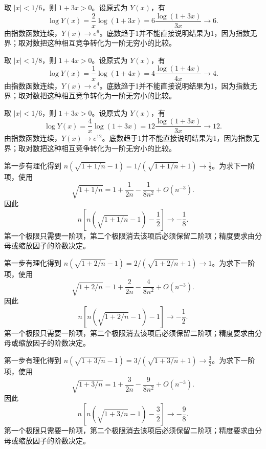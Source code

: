 \documentclass[12pt,fontset=fandol]{ctexart}
\begin{document}
\begin{solve}\label{ans:c5q4}
取 $|x|<1/6$，则 $1+3x>0$。设原式为 $Y(x)$，有
\[
\log Y(x)=\frac{2}x\log(1+3x)=6\frac{\log(1+3x)}{3x}\longrightarrow 6.
\]
由指数函数连续，$Y(x)\to e^{6}$。底数趋于1并不能直接说明结果为1，因为指数无界；取对数把这种相互竞争转化为一阶无穷小的比较。
\end{solve}

\begin{solve}\label{ans:c5q5}
取 $|x|<1/8$，则 $1+4x>0$。设原式为 $Y(x)$，有
\[
\log Y(x)=\frac{1}x\log(1+4x)=4\frac{\log(1+4x)}{4x}\longrightarrow 4.
\]
由指数函数连续，$Y(x)\to e^{4}$。底数趋于1并不能直接说明结果为1，因为指数无界；取对数把这种相互竞争转化为一阶无穷小的比较。
\end{solve}

\begin{solve}\label{ans:c5q6}
取 $|x|<1/6$，则 $1+3x>0$。设原式为 $Y(x)$，有
\[
\log Y(x)=\frac{4}x\log(1+3x)=12\frac{\log(1+3x)}{3x}\longrightarrow 12.
\]
由指数函数连续，$Y(x)\to e^{12}$。底数趋于1并不能直接说明结果为1，因为指数无界；取对数把这种相互竞争转化为一阶无穷小的比较。
\end{solve}

\begin{solve}\label{ans:c5q7}
第一步有理化得到 $n(\sqrt{1+1/n}-1)=1/(\sqrt{1+1/n}+1)\to \frac{1}{2}$。为求下一阶项，使用
\[
\sqrt{1+1/n}=1+\frac{1}{2n}-\frac{1}{8n^2}+O(n^{-3}).
\]
因此
\[
n\left[n\left(\sqrt{1+1/n}-1\right)-\frac{1}{2}\right]\longrightarrow-\frac{1}{8}.
\]
第一个极限只需要一阶项，第二个极限消去该项后必须保留二阶项；精度要求由分母或缩放因子的阶数决定。
\end{solve}

\begin{solve}\label{ans:c5q8}
第一步有理化得到 $n(\sqrt{1+2/n}-1)=2/(\sqrt{1+2/n}+1)\to 1$。为求下一阶项，使用
\[
\sqrt{1+2/n}=1+\frac{2}{2n}-\frac{4}{8n^2}+O(n^{-3}).
\]
因此
\[
n\left[n\left(\sqrt{1+2/n}-1\right)-1\right]\longrightarrow-\frac{1}{2}.
\]
第一个极限只需要一阶项，第二个极限消去该项后必须保留二阶项；精度要求由分母或缩放因子的阶数决定。
\end{solve}

\begin{solve}\label{ans:c5q9}
第一步有理化得到 $n(\sqrt{1+3/n}-1)=3/(\sqrt{1+3/n}+1)\to \frac{3}{2}$。为求下一阶项，使用
\[
\sqrt{1+3/n}=1+\frac{3}{2n}-\frac{9}{8n^2}+O(n^{-3}).
\]
因此
\[
n\left[n\left(\sqrt{1+3/n}-1\right)-\frac{3}{2}\right]\longrightarrow-\frac{9}{8}.
\]
第一个极限只需要一阶项，第二个极限消去该项后必须保留二阶项；精度要求由分母或缩放因子的阶数决定。
\end{solve}
\end{document}
